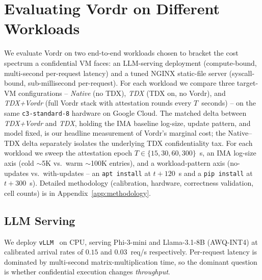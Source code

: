 %

\section{Evaluating Vordr on Different Workloads}
\label{sec:eval-workloads}

We evaluate Vordr on two end-to-end workloads chosen to bracket the
cost spectrum a confidential VM faces: an LLM-serving deployment
(compute-bound, multi-second per-request latency) and a tuned NGINX
static-file server (syscall-bound, sub-millisecond per-request). For
each workload we compare three target-VM configurations -- \emph{Native}
(no TDX), \emph{TDX} (TDX on, no Vordr), and \emph{TDX+Vordr} (full
Vordr stack with attestation rounds every $T$~seconds) -- on the same
\texttt{c3-standard-8} hardware on Google Cloud. The matched delta
between \emph{TDX+Vordr} and \emph{TDX}, holding the IMA baseline
log-size, update pattern, and model fixed, is our headline measurement
of Vordr's marginal cost; the Native--TDX delta separately isolates
the underlying TDX confidentiality tax. For each workload we sweep
the attestation epoch $T \in \{15, 30, 60, 300\}$~s, an IMA log-size
axis (cold $\sim$5K vs.\ warm $\sim$100K entries), and a workload-pattern
axis (no-updates vs.\ with-updates -- an \texttt{apt install} at
$t{+}120$~s and a \texttt{pip install} at $t{+}300$~s). Detailed
methodology (calibration, hardware, correctness validation, cell counts)
is in Appendix~\ref{app:methodology}.

\subsection{LLM Serving}
\label{sec:eval-llm}

We deploy \texttt{vLLM}~\cite{vllm} on CPU, serving Phi-3-mini and
Llama-3.1-8B (AWQ-INT4) at calibrated arrival rates of $0.15$ and
$0.03$~req/s respectively. Per-request latency is dominated by
multi-second matrix-multiplication time, so the dominant question is
whether confidential execution changes \emph{throughput}.

